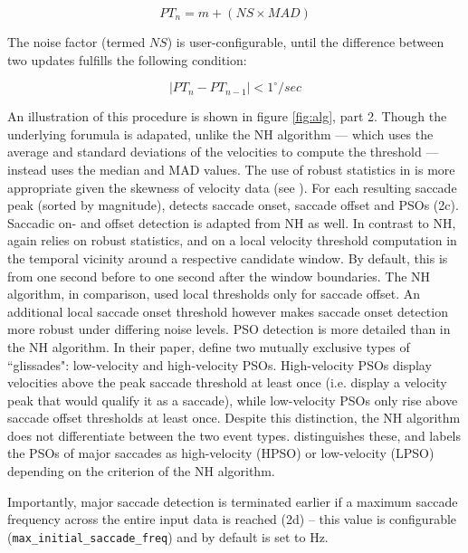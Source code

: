  $$PT_n = m + (NS \times MAD)$$ 
 
 The noise factor (termed $NS$) is user-configurable, until the difference between two updates fulfills the following condition: 
 
 $$|PT_n - PT_{n-1}| < 1^\circ/sec$$ 
 
 An illustration of this procedure is shown in figure \ref{fig:alg}, part 2. Though the underlying forumula is adapated, unlike the NH algorithm --- which uses the average and standard deviations of the velocities to compute the threshold --- \remodnav instead uses the median and MAD values. The use of robust statistics in \remodnav is more appropriate given the skewness of velocity data (see \cite{Friedman2018}). For each resulting saccade peak (sorted by magnitude), \remodnav detects saccade onset, saccade offset and PSOs (2c). Saccadic on- and offset detection is adapted from NH as well. In contrast to NH, \remodnav again relies on robust statistics, and on a local velocity threshold computation in the temporal vicinity around a respective candidate window. By default, this is from one second before to one second after the window boundaries. The NH algorithm, in comparison, used local thresholds only for saccade offset. An additional local saccade onset threshold however makes saccade onset detection more robust under differing noise levels.  PSO detection is more detailed than in the NH algorithm. In their paper, \cite{Nystrom2010AnData} define two mutually exclusive types of ``glissades": low-velocity and high-velocity PSOs. High-velocity PSOs display velocities above the peak saccade threshold at least once (i.e. display a velocity peak that would qualify it as a saccade), while low-velocity PSOs only rise above saccade offset thresholds at least once. Despite this distinction, the NH algorithm does not differentiate between the two event types. \remodnav distinguishes these, and labels the PSOs of major saccades as high-velocity (HPSO) or low-velocity (LPSO) depending on the criterion of the NH algorithm.
 
 Importantly, major saccade detection is terminated earlier if a maximum saccade frequency across the entire input data is reached (2d) -- this value is configurable (\texttt{max\_initial\_saccade\_freq}) and by default is set to \unit[2]{Hz}. 
 

